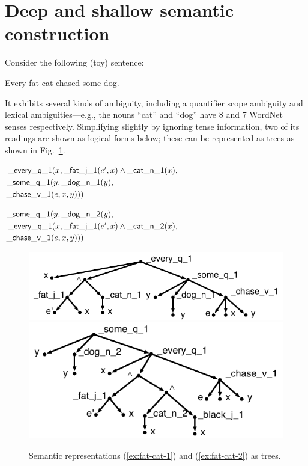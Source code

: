 \section{Deep and shallow semantic construction}
\label{sec:motivation}

Consider the
following (toy) sentence:
\begin{examples}
\label{ex:cat}
  \item Every fat cat chased some dog.
\end{examples}
It exhibits several kinds of ambiguity, including a quantifier scope
ambiguity and lexical
ambiguities---e.g., the nouns ``cat'' and ``dog'' have 8 and 7
WordNet senses respectively.  Simplifying slightly by ignoring tense
information, two of its readings are shown as logical forms below;
these can be represented as trees as shown in Fig.~\ref{fig:1}.

\begin{examples}
\item $\mathsf{\_every\_q\_1}(x, \mathsf{\_fat\_j\_1}(e',x) \wedge
    \mathsf{\_cat\_n\_1}(x),$\\
\hspace*{0.1in} $\mathsf{\_some\_q\_1}(y, \mathsf{\_dog\_n\_1}(y),$\\
\hspace*{0.2in}$\mathsf{\_chase\_v\_1}(e,x,y)))$
\label{ex:fat-cat-1}
\item $\mathsf{\_some\_q\_1}(y, \mathsf{\_dog\_n\_2}(y),$\\
\hspace*{0.1in}$\mathsf{\_every\_q\_1}(x, \mathsf{\_fat\_j\_1}(e',x) \wedge
    \mathsf{\_cat\_n\_2}(x), $\\
\hspace*{0.2in}$\mathsf{\_chase\_v\_1}(e,x,y)))$
\label{ex:fat-cat-2}
\end{examples}


\begin{figure}[t]
\centering
\includegraphics[scale=0.8]{pic-cat-chased-dog} \\
\includegraphics[scale=0.8]{pic-cat-chased-dog-2}
\caption{Semantic representations (\ref{ex:fat-cat-1}) and
  (\ref{ex:fat-cat-2}) as trees. \label{fig:1}}
\end{figure}



